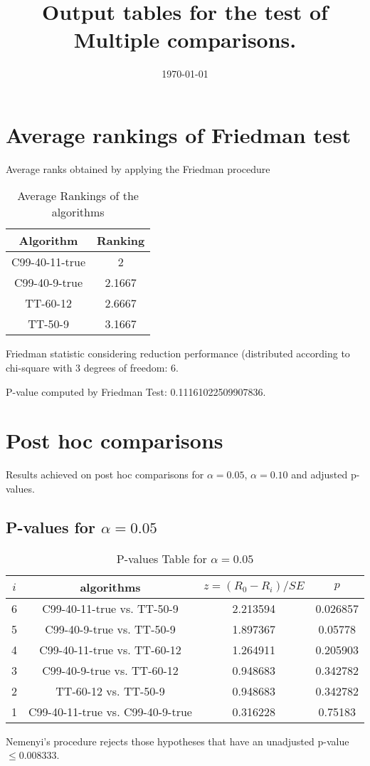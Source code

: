 \documentclass[a4paper,10pt]{article}
\title{Output tables for the test of Multiple comparisons.}
\author{}
\date{\today}
\begin{document}
\begin{landscape}
\pagestyle{empty}
\maketitle
\thispagestyle{empty}
\section{Average rankings of Friedman test}



Average ranks obtained by applying the Friedman procedure

\begin{table}[!htp]
\centering
\begin{tabular}{|c|c|}\hline
Algorithm&Ranking\\\hline
C99-40-11-true & 2\\
C99-40-9-true & 2.1667\\
TT-60-12 & 2.6667\\
TT-50-9 & 3.1667\\
\hline
\end{tabular}
\caption{Average Rankings of the algorithms}
\end{table}

Friedman statistic considering reduction performance (distributed according to chi-square with 3 degrees of freedom: 6.

P-value computed by Friedman Test: 0.11161022509907836.\newline



\pagebreak

\section{Post hoc comparisons}

Results achieved on post hoc comparisons for $\alpha = 0.05$, $\alpha = 0.10$ and adjusted p-values.

\subsection{P-values for $\alpha=0.05$}

\begin{table}[!htp]
\centering\scriptsize
\begin{tabular}{cccc}
$i$&algorithms&$z=(R_0 - R_i)/SE$&$p$\\
\hline6&C99-40-11-true vs. TT-50-9&2.213594&0.026857\\
5&C99-40-9-true vs. TT-50-9&1.897367&0.05778\\
4&C99-40-11-true vs. TT-60-12&1.264911&0.205903\\
3&C99-40-9-true vs. TT-60-12&0.948683&0.342782\\
2&TT-60-12 vs. TT-50-9&0.948683&0.342782\\
1&C99-40-11-true vs. C99-40-9-true&0.316228&0.75183\\
\hline
\end{tabular}
\caption{P-values Table for $\alpha=0.05$}
\end{table}Nemenyi's procedure rejects those hypotheses that have an unadjusted p-value $\le0.008333$.


\end{landscape}
\end{document}
